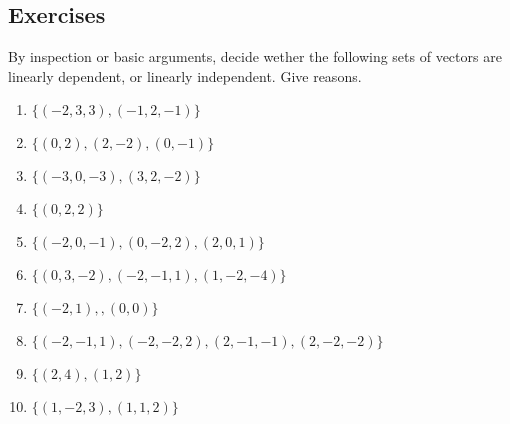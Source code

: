 \subsection{Exercises}



\begin{exercise} \label{ex:} 
By inspection or basic arguments, decide wether the following sets of vectors are linearly dependent, or linearly independent.  Give reasons.

\begin{enumerate}
\item \(\{(-2,3,3), (-1,2,-1)\}\)

\item \(\{(0,2), (2,-2), (0,-1)\}\)

\item \(\{(-3,0,-3), (3,2,-2)\}\)

\item \(\{(0,2,2)\}\)

\item \(\{(-2,0,-1), (0,-2,2), (2,0,1)\}\)

\item \(\{(0,3,-2), (-2,-1,1), (1,-2,-4)\}\)

\item \(\{(-2,1),,(0,0)\}\)

\item \(\{(-2,-1,1), (-2,-2,2), (2,-1,-1), (2,-2,-2)\}\)

\item \(\{(2,4), (1,2)\}\)

\item \(\{( 1,-2,3), (1,1,2)\}\)

\end{enumerate}
\end{exercise}








